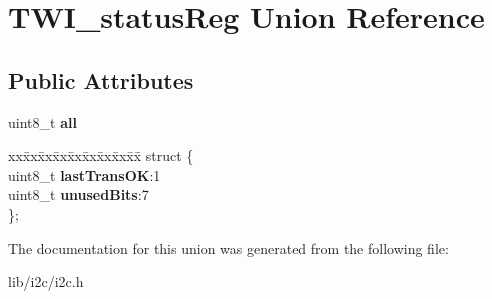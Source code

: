 \hypertarget{union_t_w_i__status_reg}{}\section{T\+W\+I\+\_\+status\+Reg Union Reference}
\label{union_t_w_i__status_reg}
\subsection*{Public Attributes}
\begin{DoxyCompactItemize}
\item 
\hypertarget{union_t_w_i__status_reg_a8f2427c1731d117f083e1923283b64ca}{}\label{union_t_w_i__status_reg_a8f2427c1731d117f083e1923283b64ca} 
uint8\+\_\+t {\bfseries all}
\item 
\hypertarget{union_t_w_i__status_reg_add7d1a7a0e0ddd8a960f89dd9aa97b0f}{}\label{union_t_w_i__status_reg_add7d1a7a0e0ddd8a960f89dd9aa97b0f} 
\begin{tabbing}
xx\=xx\=xx\=xx\=xx\=xx\=xx\=xx\=xx\=\kill
struct \{\\
\>uint8\_t {\bfseries lastTransOK}:1\\
\>uint8\_t {\bfseries unusedBits}:7\\
\}; \\

\end{tabbing}\end{DoxyCompactItemize}


The documentation for this union was generated from the following file\+:\begin{DoxyCompactItemize}
\item 
lib/i2c/i2c.\+h\end{DoxyCompactItemize}
